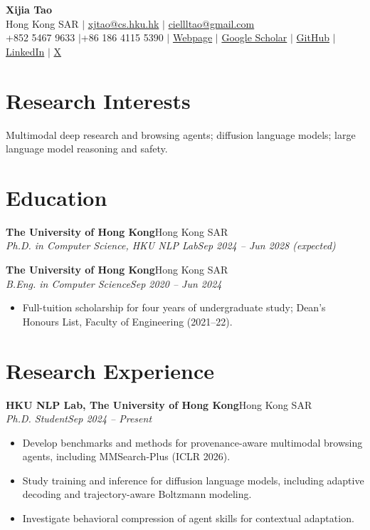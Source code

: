 \documentclass[10pt,a4paper]{article}
\newcommand{\cvheading}[4]{%
  \textbf{#1}\hfill #2\\[-1pt]
  \textit{#3}\hfill\textit{#4}\par
}
\begin{document}
\begin{center}
  {\LARGE\bfseries Xijia Tao}\\[3pt]
  Hong Kong SAR \enspace$\vert$\enspace
  \href{mailto:xjtao@cs.hku.hk}{xjtao@cs.hku.hk} \enspace$\vert$\enspace
  \href{mailto:ciellltao@gmail.com}{ciellltao@gmail.com}\\[2pt]
  +852 5467 9633 \enspace$\vert$\enspace +86 186 4115 5390 \enspace$\vert$\enspace
  \href{https://xijia-tao.github.io}{Webpage} \enspace$\vert$\enspace
  \href{https://scholar.google.com/citations?hl=en\&user=PeIV968AAAAJ}{Google Scholar} \enspace$\vert$\enspace
  \href{https://github.com/xijia-tao}{GitHub} \enspace$\vert$\enspace
  \href{https://www.linkedin.com/in/xijia-ciel-tao}{LinkedIn} \enspace$\vert$\enspace
  \href{https://x.com/xijia_tao}{X}
\end{center}

\section{Research Interests}

Multimodal deep research and browsing agents; diffusion language models; large language model reasoning and safety.

\section{Education}

\cvheading{The University of Hong Kong}{Hong Kong SAR}
  {Ph.D. in Computer Science, HKU NLP Lab}{Sep 2024 -- Jun 2028 (expected)}

\vspace{0.35em}
\cvheading{The University of Hong Kong}{Hong Kong SAR}
  {B.Eng. in Computer Science}{Sep 2020 -- Jun 2024}
\begin{itemize}
  \item Full-tuition scholarship for four years of undergraduate study; Dean's Honours List, Faculty of Engineering (2021--22).
\end{itemize}

\section{Research Experience}

\cvheading{HKU NLP Lab, The University of Hong Kong}{Hong Kong SAR}
  {Ph.D. Student}{Sep 2024 -- Present}
\begin{itemize}
  \item Develop benchmarks and methods for provenance-aware multimodal browsing agents, including MMSearch-Plus (ICLR 2026).
  \item Study training and inference for diffusion language models, including adaptive decoding and trajectory-aware Boltzmann modeling.
  \item Investigate behavioral compression of agent skills for contextual adaptation.
\end{itemize}
\end{document}
